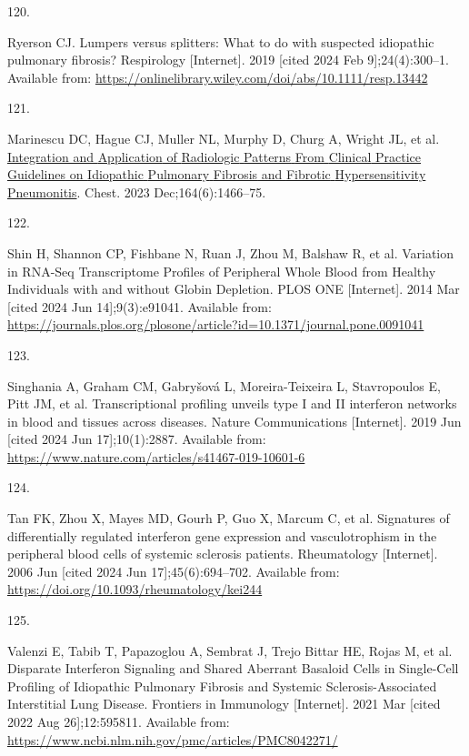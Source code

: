 \documentclass[
]{article}
\newlength{\cslhangindent}
\newlength{\csllabelwidth}
\newenvironment{CSLReferences}[2] %
 {\begin{list}{}{%
  \setlength{\itemindent}{0pt}
  \setlength{\leftmargin}{0pt}
  \setlength{\parsep}{0pt}
  \ifodd #1
   \setlength{\leftmargin}{\cslhangindent}
   \setlength{\itemindent}{-1\cslhangindent}
  \fi
  \setlength{\itemsep}{#2\baselineskip}}}
 {\end{list}}
\newcommand{\CSLLeftMargin}[1]{\parbox[t]{\csllabelwidth}{\strut#1\strut}}
\newcommand{\CSLRightInline}[1]{\parbox[t]{\linewidth - \csllabelwidth}{\strut#1\strut}}
\begin{document}
\begin{CSLReferences}{0}{1}
\CSLLeftMargin{120. }%
\CSLRightInline{Ryerson CJ. Lumpers versus splitters: {What} to do with suspected idiopathic pulmonary fibrosis? Respirology {[}Internet{]}. 2019 {[}cited 2024 Feb 9{]};24(4):300--1. Available from: \url{https://onlinelibrary.wiley.com/doi/abs/10.1111/resp.13442}}

\CSLLeftMargin{121. }%
\CSLRightInline{Marinescu DC, Hague CJ, Muller NL, Murphy D, Churg A, Wright JL, et al. \href{https://doi.org/10.1016/j.chest.2023.07.068}{Integration and {Application} of {Radiologic} {Patterns} {From} {Clinical} {Practice} {Guidelines} on {Idiopathic} {Pulmonary} {Fibrosis} and {Fibrotic} {Hypersensitivity} {Pneumonitis}}. Chest. 2023 Dec;164(6):1466--75. }

\CSLLeftMargin{122. }%
\CSLRightInline{Shin H, Shannon CP, Fishbane N, Ruan J, Zhou M, Balshaw R, et al. Variation in {RNA}-{Seq} {Transcriptome} {Profiles} of {Peripheral} {Whole} {Blood} from {Healthy} {Individuals} with and without {Globin} {Depletion}. PLOS ONE {[}Internet{]}. 2014 Mar {[}cited 2024 Jun 14{]};9(3):e91041. Available from: \url{https://journals.plos.org/plosone/article?id=10.1371/journal.pone.0091041}}

\CSLLeftMargin{123. }%
\CSLRightInline{Singhania A, Graham CM, Gabryšová L, Moreira-Teixeira L, Stavropoulos E, Pitt JM, et al. Transcriptional profiling unveils type {I} and {II} interferon networks in blood and tissues across diseases. Nature Communications {[}Internet{]}. 2019 Jun {[}cited 2024 Jun 17{]};10(1):2887. Available from: \url{https://www.nature.com/articles/s41467-019-10601-6}}

\CSLLeftMargin{124. }%
\CSLRightInline{Tan FK, Zhou X, Mayes MD, Gourh P, Guo X, Marcum C, et al. Signatures of differentially regulated interferon gene expression and vasculotrophism in the peripheral blood cells of systemic sclerosis patients. Rheumatology {[}Internet{]}. 2006 Jun {[}cited 2024 Jun 17{]};45(6):694--702. Available from: \url{https://doi.org/10.1093/rheumatology/kei244}}

\CSLLeftMargin{125. }%
\CSLRightInline{Valenzi E, Tabib T, Papazoglou A, Sembrat J, Trejo Bittar HE, Rojas M, et al. Disparate {Interferon} {Signaling} and {Shared} {Aberrant} {Basaloid} {Cells} in {Single}-{Cell} {Profiling} of {Idiopathic} {Pulmonary} {Fibrosis} and {Systemic} {Sclerosis}-{Associated} {Interstitial} {Lung} {Disease}. Frontiers in Immunology {[}Internet{]}. 2021 Mar {[}cited 2022 Aug 26{]};12:595811. Available from: \url{https://www.ncbi.nlm.nih.gov/pmc/articles/PMC8042271/}}


\end{CSLReferences}
\end{document}
